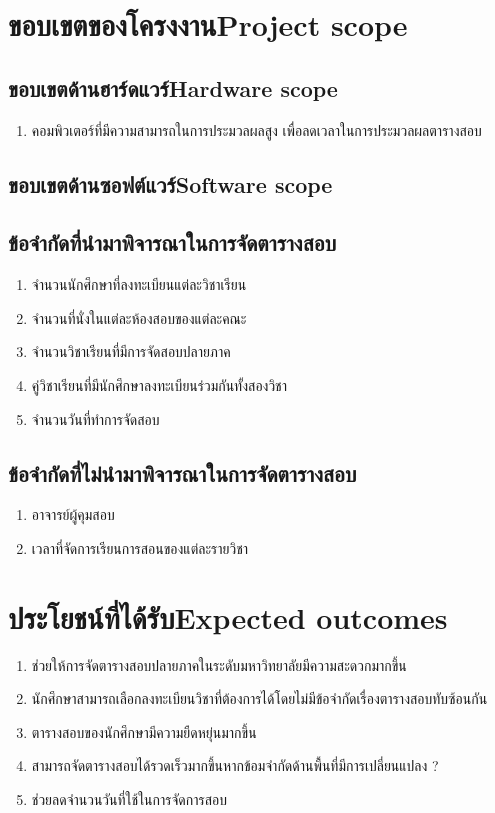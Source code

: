 \section{\ifcpe ขอบเขตของโครงงาน\else Project scope\fi}

\subsection{\ifcpe ขอบเขตด้านฮาร์ดแวร์\else Hardware scope\fi}
\begin{enumerate}
    \item คอมพิวเตอร์ที่มีความสามารถในการประมวลผลสูง เพื่อลดเวลาในการประมวลผลตารางสอบ
\end{enumerate}
\subsection{\ifcpe ขอบเขตด้านซอฟต์แวร์\else Software scope\fi}

\subsection{ข้อจำกัดที่นำมาพิจารณาในการจัดตารางสอบ}
\begin{enumerate}
    \item จำนวนนักศึกษาที่ลงทะเบียนแต่ละวิชาเรียน
    \item จำนวนที่นั่งในแต่ละห้องสอบของแต่ละคณะ
    \item จำนวนวิชาเรียนที่มีการจัดสอบปลายภาค
    \item คู่วิชาเรียนที่มีนักศึกษาลงทะเบียนร่วมกันทั้งสองวิชา
    \item จำนวนวันที่ทำการจัดสอบ
\end{enumerate}

\subsection{ข้อจำกัดที่ไม่นำมาพิจารณาในการจัดตารางสอบ}
\begin{enumerate}
    \item อาจารย์ผู้คุมสอบ
    \item เวลาที่จัดการเรียนการสอนของแต่ละรายวิชา
\end{enumerate}

\section{\ifcpe ประโยชน์ที่ได้รับ\else Expected outcomes\fi}
\begin{enumerate}
    \item ช่วยให้การจัดตารางสอบปลายภาคในระดับมหาวิทยาลัยมีความสะดวกมากขึ้น
    \item นักศึกษาสามารถเลือกลงทะเบียนวิชาที่ต้องการได้โดยไม่มีข้อจำกัดเรื่องตารางสอบทับซ้อนกัน
    \item ตารางสอบของนักศึกษามีความยืดหยุ่นมากขึ้น
    \item สามารถจัดตารางสอบได้รวดเร็วมากขึ้นหากข้อมจำกัดด้านพื้นที่มีการเปลี่ยนแปลง ?
    \item ช่วยลดจำนวนวันที่ใช้ในการจัดการสอบ
\end{enumerate}

